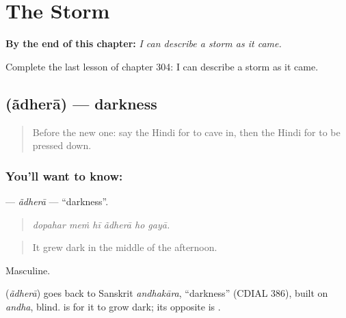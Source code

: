 
\chapter{The Storm}
\label{ch:hi-the-storm}

\begin{chapteropening}
\textbf{By the end of this chapter:} \emph{I can describe a storm as it came.}

Complete the last lesson of chapter 304: I can describe a storm as it came.
\end{chapteropening}

\section[\texorpdfstring{\hi{अँधेरा} (ãdherā)}{अँधेरा (ãdherā)}]{ (ãdherā) — darkness}

\label{lesson:HI-C304-adhera}



\begin{quote}
Before the new one: say the Hindi for to cave in, then the Hindi for to be pressed down.
\end{quote}

\subsection*{You'll want to know: }
\textbf{} — \emph{ãdherā} — \textquotedblleft{}darkness\textquotedblright{}.

\begin{quote}
     
\end{quote}

\begin{quote}
\emph{dopahar meṁ hī ãdherā ho gayā.}
\end{quote}

\begin{quote}
It grew dark in the middle of the afternoon.
\end{quote}

Masculine.

\begin{cousinweb}
\textbf{} (\emph{ãdherā}) goes back to Sanskrit \emph{andhakāra}, \textquotedblleft{}darkness\textquotedblright{} (CDIAL 386), built on \emph{andha}, blind. \textbf{ } is for it to grow dark; its opposite is \textbf{}.
\end{cousinweb}


